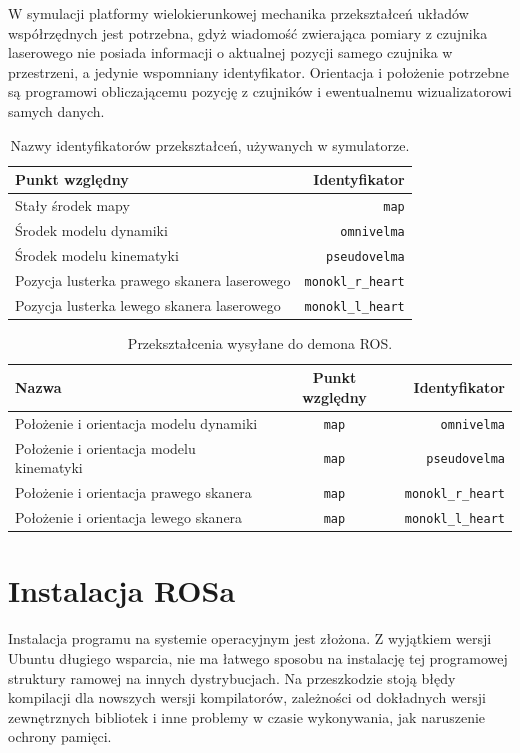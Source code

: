 	W symulacji platformy wielokierunkowej mechanika przekształceń układów współrzędnych jest potrzebna, gdyż wiadomość zwierająca pomiary z czujnika laserowego nie posiada informacji o aktualnej pozycji samego czujnika w przestrzeni, a jedynie wspomniany identyfikator. 
	Orientacja i położenie potrzebne są programowi obliczającemu pozycję z czujników i ewentualnemu wizualizatorowi samych danych.
	
	
	\begin{table}
		\centering
		\begin{tabular}{l r}
			Punkt względny & Identyfikator \\
			\hline
			Stały środek mapy & \texttt{map} \\
			Środek modelu dynamiki & \texttt{omnivelma} \\
			Środek modelu kinematyki & \texttt{pseudovelma} \\
			Pozycja lusterka prawego skanera laserowego & \texttt{monokl\_r\_heart} \\
			Pozycja lusterka lewego skanera laserowego & \texttt{monokl\_l\_heart} \\
		\end{tabular}
		\caption{Nazwy identyfikatorów przekształceń, używanych w symulatorze.}
		\label{tab:frames}
	\end{table}
		
	\begin{table}
		\centering
		\begin{tabular}{l c r}
			Nazwa & Punkt względny & Identyfikator \\
			\hline
			Położenie i orientacja modelu dynamiki & \texttt{map} & \texttt{omnivelma} \\
			Położenie i orientacja modelu kinematyki & \texttt{map} & \texttt{pseudovelma} \\
			Położenie i orientacja prawego skanera & \texttt{map} & \texttt{monokl\_r\_heart} \\
			Położenie i orientacja lewego skanera & \texttt{map} & \texttt{monokl\_l\_heart} \\
		\end{tabular}
		\caption{Przekształcenia wysyłane do demona ROS.}
		\label{tab:frame_send}
	\end{table}
			
\section{Instalacja ROSa}
	Instalacja programu na systemie operacyjnym jest złożona.
	Z wyjątkiem wersji Ubuntu długiego wsparcia, nie ma łatwego sposobu na instalację tej programowej struktury ramowej na innych dystrybucjach.
	Na przeszkodzie stoją błędy kompilacji dla nowszych wersji kompilatorów, zależności od dokładnych wersji zewnętrznych bibliotek i 
	inne problemy w czasie wykonywania, jak naruszenie ochrony pamięci. 

